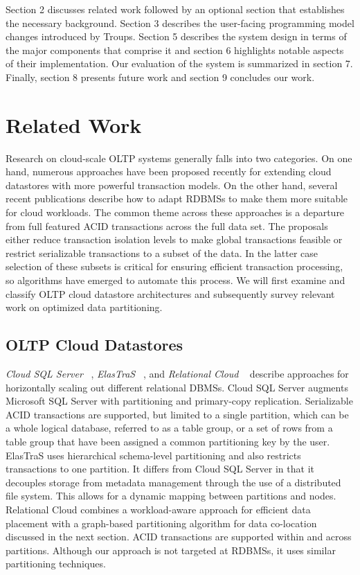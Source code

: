 \documentclass[10pt,final,journal]{IEEEtran}
\begin{document}
Section 2 discusses related work followed by an optional section that establishes the necessary background. Section 3 describes the user-facing programming model changes introduced by Troups. Section 5 describes the system design in terms of the major components that comprise it and section 6 highlights notable aspects of their implementation. Our evaluation of the system is summarized in section 7. Finally, section 8 presents future work and section 9 concludes our work.

\section{Related Work}
Research on cloud-scale OLTP systems generally falls into two categories. On one hand, numerous approaches have been proposed recently for extending cloud datastores with more powerful transaction models. On the other hand, several recent publications describe how to adapt RDBMSs to make them more suitable for cloud workloads. The common theme across these approaches is a departure from full featured ACID transactions across the full data set. The proposals either reduce transaction isolation levels to make global transactions feasible or restrict serializable transactions to a subset of the data. In the latter case selection of these subsets is critical for ensuring efficient transaction processing, so algorithms have emerged to automate this process. We will first examine and classify OLTP cloud datastore architectures and subsequently survey relevant work on optimized data partitioning.

\subsection{OLTP Cloud Datastores}
\emph{Cloud SQL Server} ~\cite{Campbell:2010:ESF:1807167.1807280, Bernstein:2011:AMS:2004686.2005651}, \emph{ElasTraS} ~\cite{Das:2009:EET:1855533.1855540, Das:2010:EAE}, and \emph{Relational Cloud} ~\cite{Curino:2011:JPMWMBZ11} describe approaches for horizontally scaling out different relational DBMSs. Cloud SQL Server augments Microsoft SQL Server with partitioning and primary-copy replication. Serializable ACID transactions are supported, but limited to a single partition, which can be a whole logical database, referred to as a table group, or a set of rows from a table group that have been assigned a common partitioning key by the user. ElasTraS uses hierarchical schema-level partitioning and also restricts transactions to one partition. It differs from Cloud SQL Server in that it decouples storage from metadata management through the use of a distributed file system. This allows for a dynamic mapping between partitions and nodes. Relational Cloud combines a workload-aware approach for efficient data placement with a graph-based partitioning algorithm for data co-location discussed in the next section. ACID transactions are supported within and across partitions. Although our approach is not targeted at RDBMSs, it uses similar partitioning techniques.
\end{document}
